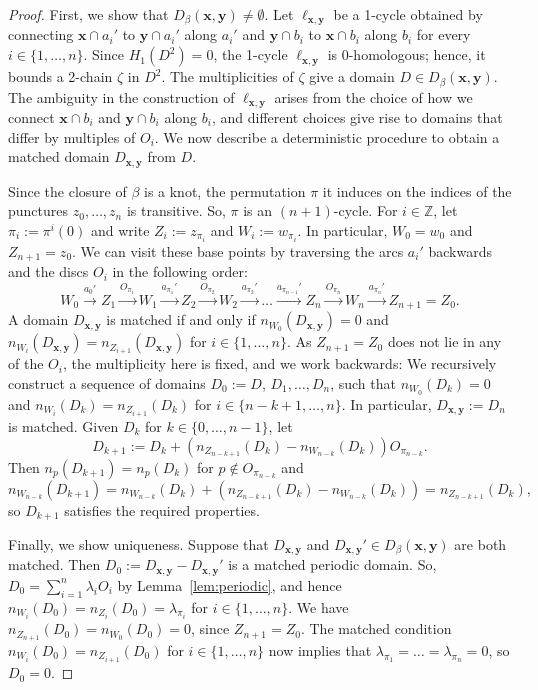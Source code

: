 \documentclass[11pt]{amsart}
\numberwithin{equation}{section}
\numberwithin{figure}{section}
\theoremstyle{definition}
\newcommand{\bZ}{\mathbb{Z}}
\newcommand{\xs}{\boldsymbol{x}}
\newcommand{\ys}{\boldsymbol{y}}
\begin{document}
\begin{proof}
    First, we show that $D_{\beta}(\xs,\ys) \neq \emptyset$. Let $\ell_{\xs,\ys}$ be a 1-cycle obtained by connecting $\xs \cap a_i'$ to $\ys \cap a_i'$ along $a_i'$ and $\ys \cap b_i$ to $\xs \cap b_i$ along $b_i$ for every $i \in \{1,\dots,n\}$. Since $H_1(D^2) = 0$, the 1-cycle $\ell_{\xs,\ys}$ is 0-homologous; hence, it bounds a 2-chain $\zeta$ in $D^2$. The multiplicities of $\zeta$ give a domain $D \in D_{\beta}(\xs,\ys)$. The ambiguity in the construction of $\ell_{\xs,\ys}$ arises from the choice of how we connect $\xs \cap b_i$ and $\ys \cap b_i$ along $b_i$, and different choices give rise to domains that differ by multiples of $O_i$. We now describe a deterministic procedure to obtain a matched domain $D_{\xs,\ys}$ from $D$.

    Since the closure of $\beta$ is a knot, the permutation $\pi$ it induces on the indices of the punctures $z_0,\dots,z_n$ is transitive. So, $\pi$ is an $(n+1)$-cycle. For $i \in \bZ$, let $\pi_i := \pi^i(0)$ and write $Z_i := z_{\pi_i}$ and $W_i := w_{\pi_i}$. In particular, $W_0 = w_0$ and $Z_{n+1} = z_0$. We can visit these base points by traversing the arcs $a_i'$ backwards and the discs $O_i$ in the following order:
    \[
    W_0 \stackrel{a_0'}{\longrightarrow} Z_1 \stackrel{O_{\pi_1}}{\longrightarrow} W_1 \stackrel{a_{\pi_1}'}{\longrightarrow} Z_2 \stackrel{O_{\pi_2}} {\longrightarrow} W_2 \stackrel{a_{\pi_2}'}{\longrightarrow} \dots \stackrel{a_{\pi_{n-1}}'}{\longrightarrow} Z_n \stackrel{O_{\pi_n}}{\longrightarrow} W_n \stackrel{a_{\pi_n}'}{\longrightarrow} Z_{n+1} = Z_0.
    \]
    A domain $D_{\xs,\ys}$ is matched if and only if $n_{W_0}(D_{\xs,\ys}) = 0$ and $n_{W_i}(D_{\xs,\ys}) = n_{Z_{i+1}}(D_{\xs,\ys})$ for $i \in \{1,\dots,n\}$. As $Z_{n+1} = Z_0$ does not lie in any of the $O_i$, the multiplicity here is fixed, and we work backwards: We recursively construct a sequence of domains $D_0 := D$, $D_1, \dots, D_n$, such that $n_{W_0}(D_k) = 0$ and $n_{W_i}(D_k) = n_{Z_{i+1}}(D_k)$ for $i \in \{n-k+1,\dots,n\}$. In particular, $D_{\xs,\ys} := D_n$ is matched. Given $D_k$ for $k \in \{0,\dots,n-1\}$, let
    \[
    D_{k+1} := D_k + (n_{Z_{n-k+1}}(D_k) - n_{W_{n-k}}(D_k)) O_{\pi_{n-k}}.
    \]
    Then $n_p(D_{k+1}) = n_p(D_k)$ for $p \not\in O_{\pi_{n-k}}$ and
    \[
    n_{W_{n-k}}(D_{k+1}) = n_{W_{n-k}}(D_k) + (n_{Z_{n-k+1}}(D_k) - n_{W_{n-k}}(D_k)) = n_{Z_{n-k+1}}(D_k),
    \]
    so $D_{k+1}$ satisfies the required properties.

    Finally, we show uniqueness. Suppose that $D_{\xs,\ys}$ and $D_{\xs,\ys}' \in D_{\beta}(\xs,\ys)$ are both matched. Then $D_0 := D_{\xs,\ys} - D_{\xs,\ys}'$ is a matched periodic domain. So, $D_0 = \sum_{i=1}^n \lambda_i O_i$ by Lemma~\ref{lem:periodic}, and hence $n_{W_i}(D_0) = n_{Z_i}(D_0) = \lambda_{\pi_i}$ for $i \in \{1,\dots,n\}$. We have $n_{Z_{n+1}}(D_0) = n_{W_0}(D_0) = 0$, since $Z_{n+1} = Z_0$. The matched condition $n_{W_i}(D_0) = n_{Z_{i+1}}(D_0)$ for $i \in \{1,\dots,n\}$ now implies that $\lambda_{\pi_1} = \dots = \lambda_{\pi_n} = 0$, so $D_0 = 0$.
\end{proof}
\end{document}
